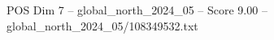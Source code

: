 \begin{textsample}{POS Dim 7 – global\_north\_2024\_05 – Score 9.00 – global\_north\_2024\_05/108349532.txt}
\end{textsample}
